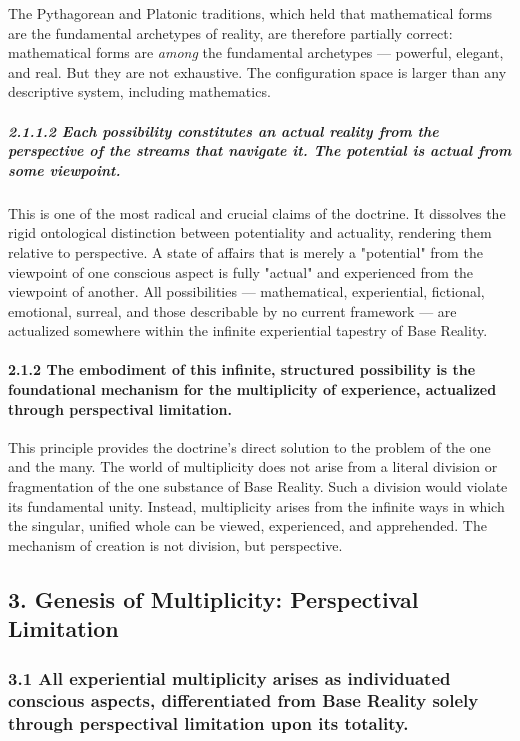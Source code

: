 The Pythagorean and Platonic traditions, which held that mathematical forms are the fundamental archetypes of reality, are therefore partially correct: mathematical forms are \textit{among} the fundamental archetypes — powerful, elegant, and real. But they are not exhaustive. The configuration space is larger than any descriptive system, including mathematics.


\subparagraph*{2.1.1.2 Each possibility constitutes an actual reality from the perspective of the streams that navigate it. The potential is actual from some viewpoint.}


This is one of the most radical and crucial claims of the doctrine. It dissolves the rigid ontological distinction between potentiality and actuality, rendering them relative to perspective. A state of affairs that is merely a "potential" from the viewpoint of one conscious aspect is fully "actual" and experienced from the viewpoint of another. All possibilities — mathematical, experiential, fictional, emotional, surreal, and those describable by no current framework — are actualized somewhere within the infinite experiential tapestry of Base Reality.


\paragraph*{2.1.2 The embodiment of this infinite, structured possibility is the foundational mechanism for the multiplicity of experience, actualized through perspectival limitation.}


This principle provides the doctrine's direct solution to the problem of the one and the many. The world of multiplicity does not arise from a literal division or fragmentation of the one substance of Base Reality. Such a division would violate its fundamental unity. Instead, multiplicity arises from the infinite ways in which the singular, unified whole can be viewed, experienced, and apprehended. The mechanism of creation is not division, but perspective.


\bigskip\noindent\makebox[\textwidth]{\color{rulegray}\rule{5cm}{0.3pt}}\bigskip


\subsection*{3. Genesis of Multiplicity: Perspectival Limitation}


\subsubsection*{3.1 All experiential multiplicity arises as individuated conscious aspects, differentiated from Base Reality solely through perspectival limitation upon its totality.}


